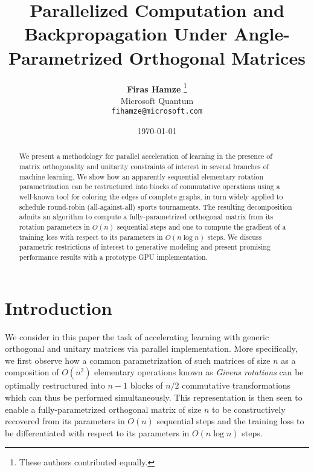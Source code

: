 \documentclass[superscriptaddress,floatfix]{article}
\begin{document}
\title{Parallelized Computation and Backpropagation Under Angle-Parametrized Orthogonal Matrices}

\author{  \textbf{Firas Hamze} \footnote{These authors contributed equally.}\\
  Microsoft Quantum \\
  \texttt{fihamze@microsoft.com}\\
}
\date{\today}

\maketitle 

\begin{abstract}
  We present a methodology for parallel acceleration of learning in
  the presence of matrix orthogonality and unitarity constraints of
  interest in several branches of machine learning.  We show how an
  apparently sequential elementary rotation parametrization can be
  restructured into blocks of commutative operations using a
  well-known tool for coloring the edges of complete graphs, in turn
  widely applied to schedule round-robin (all-against-all) sports
  tournaments. The resulting decomposition admits an algorithm to
  compute a fully-parametrized orthogonal matrix from its rotation
  parameters in $O(n)$ sequential steps and one to compute the
  gradient of a training loss with respect to its parameters in
  $O(n\log n)$ steps. We discuss parametric restrictions of interest
  to generative modeling and present promising performance results
  with a prototype GPU implementation.
\end{abstract}

\section{Introduction}
\label{sec:intro}
We consider in this paper the task of accelerating learning with
generic orthogonal and unitary matrices via parallel
implementation. More specifically, we first observe how a common
parametrization of such matrices of size $n$ as a composition of
$O(n^2)$ elementary operations known as \emph{Givens rotations} can
be optimally restructured into $n-1$ blocks of $n/2$ commutative
transformations which can thus be performed simultaneously. This
representation is then seen to enable a fully-parametrized
orthogonal matrix of size $n$ to be constructively recovered from
its parameters in $O(n)$ sequential steps and the training loss to
be differentiated with respect to its parameters in $O(n\log n)$
steps.
\end{document}
